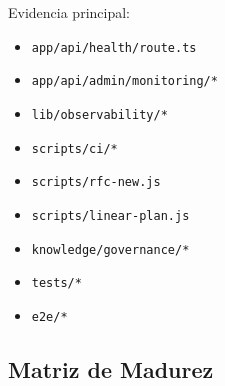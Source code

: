 \documentclass[
  10pt,
  letterpaper,
]{article}
\providecommand{\tightlist}{%
  \setlength{\itemsep}{0pt}\setlength{\parskip}{0pt}}
\let\oldtexttt\texttt
\renewcommand{\texttt}[1]{\oldtexttt{\small #1}}
\begin{document}
Evidencia principal:

\begin{itemize}
\tightlist
\item
  \texttt{app/api/health/route.ts}
\item
  \texttt{app/api/admin/monitoring/*}
\item
  \texttt{lib/observability/*}
\item
  \texttt{scripts/ci/*}
\item
  \texttt{scripts/rfc-new.js}
\item
  \texttt{scripts/linear-plan.js}
\item
  \texttt{knowledge/governance/*}
\item
  \texttt{tests/*}
\item
  \texttt{e2e/*}
\end{itemize}

\subsection{Matriz de Madurez}\label{matriz-de-madurez}
\end{document}
